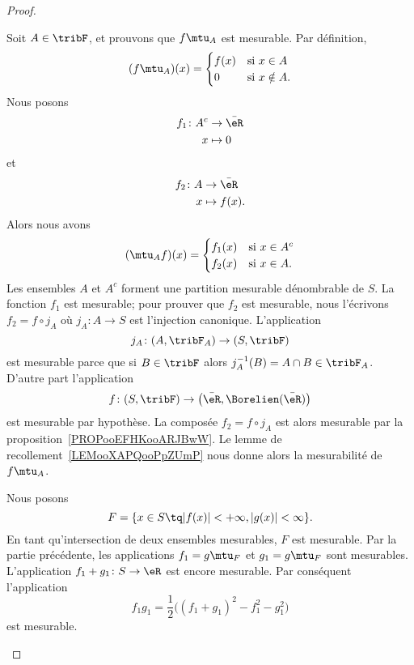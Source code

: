 \begin{proof}
\begin{subproof}
\begin{subproof}
			Soit \( A\in \tribF\), et prouvons que \( f\mtu_A\) est mesurable. Par définition,
			\begin{equation}
				(f\mtu_A)(x)=\begin{cases}
					f(x) & \text{si } x\in A     \\
					0    & \text{si } x\notin A.
				\end{cases}
			\end{equation}
			Nous posons \begin{equation}
				\begin{aligned}
					f_1\colon A^c & \to \bar \eR \\
					x             & \mapsto 0
				\end{aligned}
			\end{equation}
			et
			\begin{equation}
				\begin{aligned}
					f_2\colon A & \to \bar \eR  \\
					x           & \mapsto f(x).
				\end{aligned}
			\end{equation}
			Alors nous avons
			\begin{equation}
				(\mtu_Af)(x)=\begin{cases}
					f_1(x) & \text{si } x\in A^c \\
					f_2(x) & \text{si } x\in  A.
				\end{cases}
			\end{equation}
			Les ensembles \( A\) et \( A^c\) forment une partition mesurable dénombrable de \( S\). La fonction \( f_1\) est mesurable; pour prouver que \( f_2\) est mesurable, nous l'écrivons \( f_2=f\circ j_A\) où \( j_A\colon A\to S\) est l'injection canonique. L'application
			\begin{equation}
				j_A\colon (A,\tribF_A)\to (S,\tribF)
			\end{equation}
			est mesurable parce que si \( B\in\tribF\) alors \( j_A^{-1}(B)=A\cap B\in\tribF_A\). D'autre part l'application
			\begin{equation}
				f\colon (S,\tribF)\to \big( \bar \eR,\Borelien(\bar \eR) \big)
			\end{equation}
			est mesurable par hypothèse. La composée \( f_2=f\circ j_A\) est alors mesurable par la proposition~\ref{PROPooEFHKooARJBwW}. Le lemme de recollement~\ref{LEMooXAPQooPpZUmP} nous donne alors la mesurabilité de \( f\mtu_A\).

			Nous posons
			\begin{equation}
				F=\{ x\in S\tq | f(x) |<+\infty,| g(x) |<\infty \}.
			\end{equation}
			En tant qu'intersection de deux ensembles mesurables, \( F\) est mesurable. Par la partie précédente, les applications \( f_1=g\mtu_F\) et \( g_1=g\mtu_F\) sont mesurables. L'application \( f_1+g_1\colon S\to \eR\) est encore mesurable. Par conséquent l'application
			\begin{equation}
				f_1g_1=\frac{ 1 }{2}\big( (f_1+g_1)^2-f_1^2-g_1^2 \big)
			\end{equation}
			est mesurable.


\end{subproof}
\end{subproof}
\end{proof}
